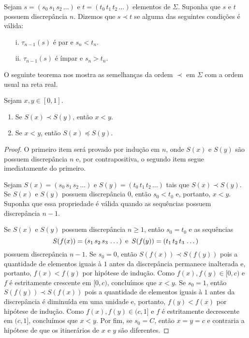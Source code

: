 \begin{definition}
Sejam $s = (s_0\, s_1\, s_2\, \dots)$ e $t = (t_0\, t_1\, t_2\, \dots)$ elementos de $\Sigma$. Suponha que $s$ e $t$ possuem discrepância $n$. Dizemos que $s \prec t$ se alguma das seguintes condições é válida:
\begin{enumerate}
\item[i.] $\tau_{n-1}(s)$ é par e $s_n < t_n$.
\item[ii.] $\tau_{n-1}(s)$ é ímpar e $s_n > t_n$.
\end{enumerate}
\end{definition}

O seguinte teorema nos mostra as semelhanças da ordem $\prec$ em $\Sigma$ com a ordem usual na reta real.

\begin{theorem}
\label{teo1}
Sejam $x, y \in [0, 1]$.
\begin{enumerate}
\item Se $S(x) \prec S(y)$, então $x < y$.
\item Se $x < y$, então $S(x) \preceq S(y)$.
\end{enumerate}
\end{theorem}

\begin{proof}
O primeiro item será provado por indução em $n$, onde $S(x)$ e $S(y)$ são possuem discrepância $n$ e, por contrapositiva, o segundo item segue imediatamente do primeiro.

Sejam $S(x) = (s_0\, s_1\, s_2\, \dots)$ e $S(y) = (t_0\, t_1\, t_2\, \dots)$ tais que $S(x) \prec S(y)$. Se $S(x)$ e $S(y)$ possuem discrepância $0$, então $s_0 < t_0$ e, portanto, $x < y$. Suponha que essa propriedade é válida quando as sequências possuem discrepância $n-1$.

Se $S(x)$ e $S(y)$ possuem discrepância $n \geq 1$, então $s_0 = t_0$ e as sequências 
$$S(f(x)) = (s_1\, s_2\, s_3\, \dots) \textrm{\, e \,} S(f(y)) = (t_1\, t_2\, t_3\, \dots)$$
possuem discrepância $n-1$. Se $s_0 = 0$, então $S(f(x)) \prec S(f(y))$ pois a quantidade de elementos iguais à $1$ antes da discrepância permanece inalterada e, portanto, $f(x) < f(y)$ por hipótese de indução. Como $f(x), f(y) \in [0, c)$ e $f$ é estritamente crescente em $[0, c)$, concluímos que $x < y$. Se $s_0 = 1$, então $S(f(y)) \prec S(f(x))$ pois a quantidade de elementos iguais à $1$ antes da discrepância é diminuída em uma unidade e, portanto, $f(y) < f(x)$ por hipótese de indução. Como $f(x), f(y) \in (c, 1]$ e $f$ é estritamente decrescente em $(c, 1]$, concluímos que $x < y$. Por fim, se $s_0 = C$, então $x = y = c$ e contraria a hipótese de que os itinerários de $x$ e $y$ são diferentes.
\end{proof}

